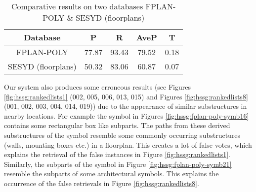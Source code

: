 \begin{table}[h!]
\centering
\caption{Comparative results on two databases FPLAN-POLY \& SESYD (floorplans)}
\begin{tabular}{ccccc}
\toprule
\hline
\textbf{Database} & \textbf{P} & \textbf{R} & \textbf{AveP} & \textbf{T}\\
\hline 
FPLAN-POLY & 77.87 & 93.43 & 79.52 & 0.18 \\
SESYD (floorplans) & 50.32 & 83.06 & 60.87 & 0.07 \\
\hline
\end{tabular}
\label{tab:hssg:res-comp-db}
\end{table}

Our system also produces some erroneous results (see Figures \ref{fig:hssg:rankedlists1} (002, 005, 006, 013, 015) and Figures \ref{fig:hssg:rankedlists8} (001, 002, 003, 004, 014, 019)) due to the appearance of similar substructures in nearby locations. For example the symbol in Figures \ref{fig:hssg:fplan-poly-symb16} contains some rectangular box like subparts. The paths from these derived substructures of the symbol resemble some commonly occurring substructures (walls, mounting boxes etc.) in a floorplan. This creates a lot of false votes, which explains the retrieval of the false instances in Figure \ref{fig:hssg:rankedlists1}. Similarly, the subparts of the symbol in Figure \ref{fig:hssg:fplan-poly-symb21} resemble the subparts of some architectural symbols. This explains the occurrence of the false retrievals in Figure \ref{fig:hssg:rankedlists8}.

\begin{figure*}[h!]
\centering  
{
\\
}
\caption{Qualitative results of the method: first 20 retrieved regions obtained by querying the symbol \ref{fig:hssg:fplan-poly-symb21} in the FPLAN-POLY dataset.}
\label{fig:hssg:rankedlists8}
\end{figure*}

